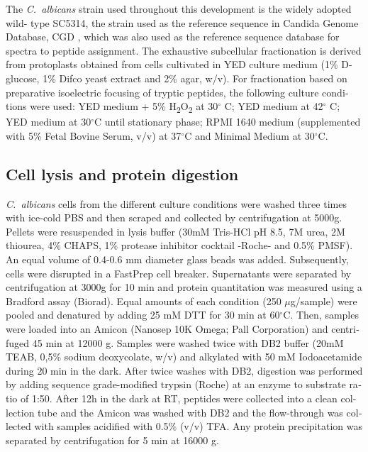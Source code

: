 \begin{otherlanguage}{british}
The \textit{\mbox{C. albicans}} strain used throughout this development is the widely adopted wild-
type SC5314, the strain used as the reference sequence in Candida Genome Database,
CGD \citep{Costanzo2006a}, which was also used as the reference sequence database for spectra to peptide
assignment.
The exhaustive subcellular fractionation is derived from protoplasts obtained from cells
cultivated in YED culture medium (1\% D-glucose, 1\% Difco yeast extract and 2\% agar, w/v).
For fractionation based on preparative isoelectric focusing of tryptic peptides, the following
culture conditions were used: YED medium + 5\% H\textsubscript{2}O\textsubscript{2} at 30$^{\circ}$ C; YED medium at 42$^{\circ}$ C;
YED medium at 30$^{\circ}$C until stationary phase; RPMI 1640 medium (supplemented with 5\%
Fetal Bovine Serum, v/v) at 37$^{\circ}$C and Minimal Medium at 30$^{\circ}$C.


\subsection*{Cell lysis and protein digestion}

\textit{\mbox{C. albicans}} cells from the different culture conditions were washed three times with ice-cold
PBS and then scraped and collected by centrifugation at 5000g. Pellets were resuspended in
lysis buffer (30mM Tris-HCl pH 8.5, 7M urea, 2M thiourea, 4\% CHAPS, 1\% protease inhibitor
cocktail -Roche- and 0.5\% PMSF). An equal volume of 0.4-0.6 mm diameter glass beads
was added. Subsequently, cells were disrupted in a FastPrep cell breaker. Supernatants
were separated by centrifugation at 3000g for 10 min and protein quantitation was measured
using a Bradford assay (Biorad).
Equal amounts of each condition (250 $\mu$g/sample) were pooled and denatured by adding 25
mM DTT for 30 min at 60$^{\circ}$C. Then, samples were loaded into an Amicon (Nanosep 10K
Omega; Pall Corporation) and centrifuged 45 min at 12000 g. Samples were washed twice
with DB2 buffer (20mM TEAB, 0,5\% sodium deoxycolate, w/v) and alkylated with 50 mM
Iodoacetamide during 20 min in the dark. After twice washes with DB2, digestion was
performed by adding sequence grade-modified trypsin (Roche) at an enzyme to substrate
ratio of 1:50. After 12h in the dark at RT, peptides were collected into a clean collection tube
and the Amicon was washed with DB2 and the flow-through was collected with samples
acidified with 0.5\% (v/v) TFA. Any protein precipitation was separated by centrifugation for 5
min at 16000 g.



\end{otherlanguage}
